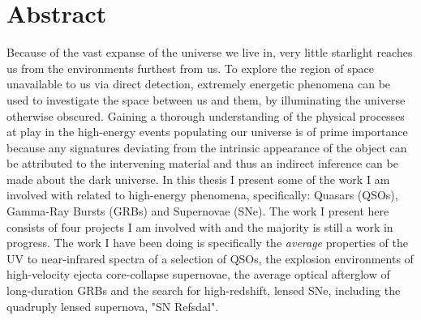 %
\chapter*{Abstract}
\label{sec:abstract}
\vspace*{-10mm}

Because of the vast expanse of the universe we live in, very little starlight reaches us from the environments furthest from us. To explore the region of space unavailable to us via direct detection, extremely energetic phenomena can be used to investigate the space between us and them, by illuminating the universe otherwise obscured. Gaining a thorough understanding of the physical processes at play in the high-energy events populating our universe is of prime importance because any signatures deviating from the intrinsic appearance of the object can be attributed to the intervening material and thus an indirect inference can be made about the dark universe. In this thesis I present some of the work I am involved with related to high-energy phenomena, specifically: Quasars (QSOs), Gamma-Ray Bursts (GRBs) and Supernovae (SNe). The work I present here consists of four projects I am involved with and the majority is still a work in progress. The work I have been doing is specifically the \textit{average} properties of the UV to near-infrared spectra of a selection of QSOs, the explosion environments of high-velocity ejecta core-collapse supernovae, the average optical afterglow of long-duration GRBs and the search for high-redshift, lensed SNe, including the quadruply lensed supernova, "SN Refsdal".




